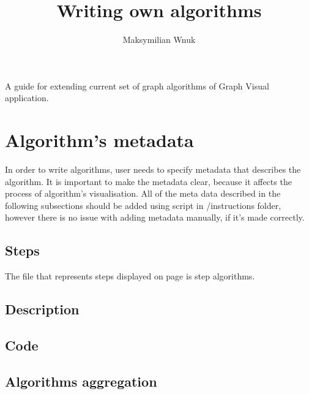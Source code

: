 \documentclass[12pt, letterpaper]{article}
\title{Writing own algorithms}
\author{Maksymilian Wnuk}
\begin{document}
\maketitle
A guide for extending current set of
graph algorithms of Graph Visual application.
\pagebreak
\tableofcontents
\pagebreak

\section{Algorithm's metadata}
In order to write algorithms, user needs to specify 
metadata that describes the algorithm. It is important
to make the metadata clear, because it affects the 
process of algorithm's visualisation. All of the
meta data described in the following subsections
should be added using script in /instructions folder,
however there is no issue with adding metadata manually,
if it's made correctly.

\subsection{Steps}
The file that represents steps displayed on page
is step algorithms.

\subsection{Description}

\subsection{Code}

\subsection{Algorithms aggregation}
\end{document}
